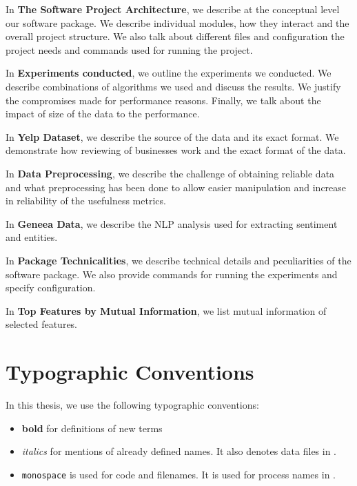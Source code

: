 In \textbf{ The Software Project Architecture}, we describe at the conceptual level our software package.
We describe individual modules, how they interact and the overall project structure.
We also talk about different files and configuration the project needs and commands used for running the project.

In \textbf{ Experiments conducted}, we outline the experiments we conducted.
We describe combinations of algorithms we used and discuss the results.
We justify the compromises made for performance reasons.
Finally, we talk about the impact of size of the data to the performance.

In \textbf{ Yelp Dataset},
we describe the source of the data and its exact format.
We demonstrate how reviewing of businesses work and
the exact format of the data.

In \textbf{ Data Preprocessing},
we describe the challenge of obtaining reliable data and
what preprocessing has been done to allow easier manipulation and increase in reliability of the usefulness metrics.

In \textbf{ Geneea Data},
we describe the NLP analysis used for extracting sentiment and entities.

In \textbf{ Package Technicalities},
we describe technical details and peculiarities of the software package.
We also provide commands for running the experiments and specify configuration.

In \textbf{ Top Features by Mutual Information},
we list mutual information of selected features.


\section{Typographic Conventions}

In this thesis, we use the following typographic conventions:

\begin{itemize}
\item \textbf{bold} for definitions of new terms

\item \textit{italics} for mentions of already defined names. It also denotes data files in .

\item \texttt{monospace} is used for code and filenames. It is used for process names in .

\end{itemize}

